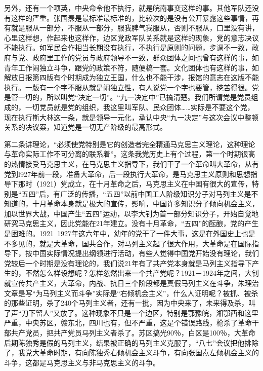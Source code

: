 另外，还有一个项英，中央命令他不执行，就是皖南事变这样的事。其他军队还没有这样的严重。张国焘是最标准最标准的，比较次的是没有公开暴露这些事情，再有就是服从一部分，不服从一部分，服我脾气我服从，否则不服从，口里没有讲，心里这样想，作起来也这样作，边区党政军队关系就是这样的现象，党的意志决议不能执行。如军民合作相当长期没有执行，不执行是原则的问题，步调不一致，政府与党、政府里工作的党员与政府领导不一致，群众团体之间也曾有这样的事，如青年工作闹独立斗争，跟党的政策不符，随便槁一套。文化团体也有这样的事，如解放日报第四版有个时期成为独立王国，什么也不能干涉，报馆的意志在这版不能执行。一版有一个字不服从就是闹独立性，有人说党一个字也要管，挖苦得很。党是管一切的，所以叫党“决定一切”。“九一决定中”已搞清楚。我们所谓党是党员组成的，一切党员就是党的组织，我这里叫军队、民众团体……实际是不要这个党，现在执行斯大林这一条，就是领导一元化，承认中央“九一决定”与这次会议中整顿关系的决议案，知道党是一切无产阶级的最高形式。

第二条讲理论，“必须使党特别是它的创造者完全精通马克思主义理论，这种理论与革命实际工作不可分离的联系着”。这条我党历史上有个过程，第一个时期很高的热情接受马克思主义，在马克思主义指导下，我们干了一个革命叫大革命，从有党到l927年前一段，准备大革命，后一段执行大革命，是马克思主义原则和思想指导下那时（1921）党成立，在十月革命之后，马克思主义在中国有很大的宣传，特别是“五四”后，有广泛的传播，“五四”以前中国工人阶级知识分子对马列主义是不知道的，十月革命本身就是极大的宣传，影响，中国许多知识分子倾向机会主义，加以世界大战，中国产生“五四”运动，以李大钊为首一部分知识分子，开始自觉地研究马克思主义，因此党能在21年建立。没有十月革命，“五四”的酝酿，党的产生是困难的。1921~1927年这六年中，幼年的党干了一件大事，这是在外国史上也是不多见的，就是大革命，国共合作，对马列主义起了很大作用，大革命是在国际指导下，按中国实际情况提出纲领进行活动，有些人觉得中国党开始没有理论，我们党较后一个时期是没有理论的，我们说21年有了共产党本身就是马列主义指导下产生的，不然怎么样设想呢？怎样忽然出来一个共产党呢？1921－1924年之间，大钊就宣传共产主义，大革命，内战、抗日三个阶段都是真假马列主义在斗争，朱理治文章是写“为马列主义而斗争”实际是“右倾机会主义”，什么人证明呢？被抓、被杀的那些证明，杀了240个马列主义者，还有一批，因为中央来了，未来得及杀，叫了声“刀下留人”又放了。这种现象不只是一个边区，特别是鄂豫皖，湘鄂西和这里严重，中央苏区，赣东北，四川也有，但不严重，这是个错误路线，枪杀了革命干部共产党员，把共产党员马列主义者杀了。苏区搞光90％，白区是100％，大革命后期陈独秀是假的马列主义，结果被正确的马列主义克服了，“八七”会议把他排除了，我党大革命时期，有向陈独秀右倾机会主义斗争，有向张国焘左倾机会主义的斗争，这都是马克思主义与非马克思主义的斗争。

